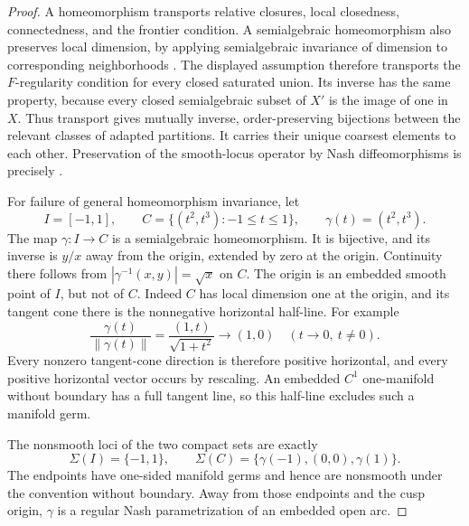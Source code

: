 \begin{proof}
A homeomorphism transports relative closures, local closedness,
connectedness, and the frontier condition.  A semialgebraic
homeomorphism also preserves local dimension, by applying
semialgebraic invariance of dimension to corresponding neighborhoods
\cite[Proposition~1.8, p.~5]{Coste2007}.  The displayed assumption
therefore transports the $F$-regularity condition for every closed
saturated union.  Its inverse has the same property, because every
closed semialgebraic subset of $X'$ is the image of one in $X$.
Thus transport gives mutually inverse, order-preserving bijections
between the relevant classes of adapted partitions.  It carries
their unique coarsest elements to each other.  Preservation of the
smooth-locus operator by Nash diffeomorphisms is precisely
\cite[Lemma~2.3, p.~636]{Fernando2018}.

For failure of general homeomorphism invariance, let
\[
 I=[-1,1],\qquad
 C=\{(t^2,t^3):-1\le t\le1\},\qquad
 \gamma(t)=(t^2,t^3).
\]
The map $\gamma:I\to C$ is a semialgebraic homeomorphism.
It is bijective, and its inverse is $y/x$ away from the origin,
extended by zero at the origin.  Continuity there follows from
$|\gamma^{-1}(x,y)|=\sqrt{x}$ on $C$.
The origin is an embedded smooth point of $I$, but not of $C$.
Indeed $C$ has local dimension one at the origin, and its tangent
cone there is the nonnegative horizontal half-line.  For example
\[
 \frac{\gamma(t)}{\|\gamma(t)\|}
   =\frac{(1,t)}{\sqrt{1+t^2}}
   \longrightarrow(1,0)
 \quad (t\longrightarrow0,\ t\ne0).
\]
Every nonzero tangent-cone direction is therefore positive horizontal,
and every positive horizontal vector occurs by rescaling.
An embedded $C^1$ one-manifold without boundary has a full tangent
line, so this half-line excludes such a manifold germ.

The nonsmooth loci of the two compact sets are exactly
\[
 \Sigma(I)=\{-1,1\},\qquad
 \Sigma(C)=\{\gamma(-1),(0,0),\gamma(1)\}.
\]
The endpoints have one-sided manifold germs and hence are nonsmooth
under the convention without boundary.  Away from those endpoints
and the cusp origin, $\gamma$ is a regular Nash parametrization of
an embedded open arc.


\end{proof}
